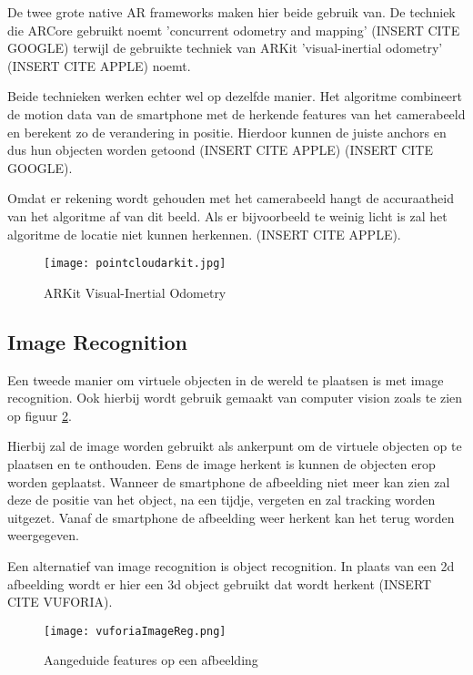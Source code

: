 De twee grote native AR frameworks maken hier beide gebruik van. De techniek die ARCore gebruikt noemt 'concurrent odometry and mapping' (INSERT CITE GOOGLE) terwijl de gebruikte techniek van ARKit 'visual-inertial odometry' (INSERT CITE APPLE) noemt. 

Beide technieken werken echter wel op dezelfde manier. Het algoritme combineert de motion data van de smartphone met de herkende features van het camerabeeld en berekent zo de verandering in positie. Hierdoor kunnen de juiste anchors en dus hun objecten worden getoond (INSERT CITE APPLE) (INSERT CITE GOOGLE).

Omdat er rekening wordt gehouden met het camerabeeld hangt de accuraatheid van het algoritme af van dit beeld. Als er bijvoorbeeld te weinig licht is zal het algoritme de locatie niet kunnen herkennen. (INSERT CITE APPLE).

\begin{figure}
    \texttt{[image: pointcloudarkit.jpg]}
    \caption{ARKit Visual-Inertial Odometry}
    \label{fig:pointcloudarkit}
\end{figure}


\subsection{Image Recognition}
Een tweede manier om virtuele objecten in de wereld te plaatsen is met image recognition. Ook hierbij wordt gebruik gemaakt van computer vision zoals te zien op figuur \ref{fig:imagereg}.

Hierbij zal de image worden gebruikt als ankerpunt om de virtuele objecten op te plaatsen en te onthouden. Eens de image herkent is kunnen de objecten erop worden geplaatst. Wanneer de smartphone de afbeelding niet meer kan zien zal deze de positie van het object, na een tijdje, vergeten en zal tracking worden uitgezet. Vanaf de smartphone de afbeelding weer herkent kan het terug worden weergegeven.

Een alternatief van image recognition is object recognition. In plaats van een 2d afbeelding wordt er hier een 3d object gebruikt dat wordt herkent (INSERT CITE VUFORIA).

\begin{figure}
    \texttt{[image: vuforiaImageReg.png]}
    \caption{Aangeduide features op een afbeelding}
    \label{fig:imagereg}
\end{figure}

